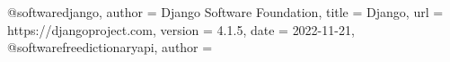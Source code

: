 @software{django,
  author = {{Django Software Foundation}},
  title = {Django},
  url = {https://djangoproject.com},
  version = {4.1.5},
  date = {2022-11-21},
}
@software{freedictionaryapi,
author = {{}}
}